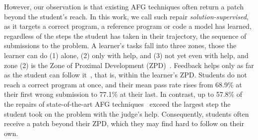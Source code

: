 \documentclass[conference]{IEEEtran}
\begin{document}
However, our observation is that existing AFG techniques often return a patch beyond the student's reach. In this work, we call such repair \emph{solution-supervised}, as it targets a correct program, a reference program or code a model has learned, regardless of the steps the student has taken in their trajectory, the sequence of submissions to the problem. A learner's tasks fall into three zones, those the learner can do (1) alone, (2) only with help, and (3) not yet even with help, and zone (2) is the Zone of Proximal Development (ZPD)~\cite{cole1978mind}. Feedback helps only as far as the student can follow it~\cite{narciss2008feedback,aleven2000limitations}, that is, within the learner's ZPD. Students do not reach a correct program at once, and their mean pass rate rises from 68.9\% at their first wrong submission to 77.1\% at their last. In contrast, up to 57.8\% of the repairs of state-of-the-art AFG techniques~\cite{hu2019re,xie2024brafar,choi2025automated,dai2026learner} exceed the largest step the student took on the problem with the judge's help. Consequently, students often receive a patch beyond their ZPD, which they may find hard to follow on their own.
\end{document}
